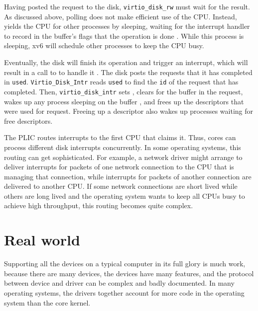 Having posted the request to the disk,
\lstinline{virtio_disk_rw}
must wait for the result.  As discussed above,
polling does not make efficient use of the CPU.
Instead,
yields the CPU for other processes by sleeping,
waiting for the interrupt handler to 
record in the buffer's flags that the operation is done
.
While this process is sleeping,
xv6 will schedule other processes to keep the CPU busy.

Eventually, the disk will finish its operation and trigger an
interrupt, which will result in a call to
to handle it
.
The disk posts the requests that it has completed in \lstinline{used}.
\lstinline{Virtio_Disk_Intr}
reads \lstinline{used} to find the \lstinline{id} of
the request that has completed.
Then, \lstinline{virtio_disk_intr}
sets 
,
clears
 for the buffer in the request,
wakes up any process sleeping on the buffer
,
and frees up the descriptors that were used for request.
Freeing up a descriptor also wakes up processes
waiting for free descriptors.

The PLIC routes interrupts to the first CPU that claims it.
Thus, cores can process different disk interrupts concurrently.  In
some operating systems, this routing can get sophisticated.  For
example, a network driver might arrange to deliver interrupts for
packets of one network connection to the CPU that is managing
that connection, while interrupts for packets of another connection
are delivered to another CPU.  If some network connections are
short lived while others are long lived and the operating system wants
to keep all CPUs busy to achieve high throughput, this routing
becomes quite complex.

\section{Real world}

Supporting all the devices on a typical computer in its full glory is
much work, because there are many devices, the devices have many
features, and the protocol between device and driver can be complex
and badly documented.
In many operating systems, the drivers together account for more code
in the operating system than the core kernel.

